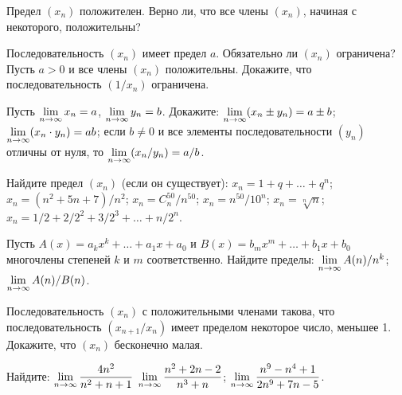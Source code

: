 \documentclass[a4paper,12pt]{article}
\begin{document}
Предел $(x_n)$ положителен. Верно ли, что все члены $(x_n)$, начиная с некоторого, положительны?

\begin{mdframed}[hidealllines=true, leftline=true, linecolor=gray!60,rightmargin=-10pt,outerlinewidth=4pt,innerbottommargin=.2\baselineskip,innertopmargin=.2\baselineskip,]
Последовательность $(x_n)$ имеет предел $a$.
Обязательно ли $(x_n)$ ограничена?\\
Пусть $a>0$ и все члены $(x_n)$ положительны. Докажите, что последовательность $(1/x_n)$ ограничена.
\end{mdframed}

\begin{mdframed}[hidealllines=true, leftline=true, linecolor=gray!60,rightmargin=-10pt,outerlinewidth=4pt]
Пусть
$\lim\limits_{n \rightarrow \infty} x_n = a$,
$\lim\limits_{n \rightarrow \infty} y_n = b$.
Докажите:
$\lim\limits_{n \rightarrow \infty} (x_n \pm y_n)= a \pm b$;
$\lim\limits_{n \rightarrow \infty} (x_n \cdot y_n) = ab$;
если $b\ne0$ и все элементы последовательности $(y_n)$ отличны от нуля, то $\lim\limits_{n \rightarrow \infty} (x_n/y_n) = a/b$.
\end{mdframed}

Найдите предел $(x_n)$ (если он существует):
%
{ $x_n=1+q+\ldots+q^{n}$;}%
{ $x_n=(n^2+5n+7)/n^2$;}%
{ $x_n=C^{50}_n/n^{50}$;}
\medskip
{}%
{ $x_n=n^{50}/10^n$;}%
{ $x_n=\sqrt[n]{n}$;}%
{ $x_n=1/2+2/2^2+3/2^3+\ldots+n/2^n$.}%


\newpage

\begin{mdframed}[hidealllines=true, leftline=true, linecolor=gray!60,rightmargin=-10pt,outerlinewidth=4pt]
Пусть $A(x)=a_k x^k+\ldots+a_1x+a_0$ и $B(x)=b_m x^m+\ldots+b_1x+b_0$\т многочлены степеней $k$ и $m$ соответственно. Найдите пределы:
$\lim\limits_{n \rightarrow \infty} A(n)/n^k$;
$\lim\limits_{n \rightarrow \infty} A(n)/B(n)$.
\end{mdframed}


Последовательность $(x_n)$ с положительными членами такова, что последовательность $(x_{n+1}/x_n)$ имеет пределом некоторое число, меньшее 1. Докажите, что $(x_n)$ бесконечно малая.

Найдите:
 $\lim\limits_{n \rightarrow \infty} \dfrac{4n^2}{n^2+n+1}$
 $\lim\limits_{n \rightarrow \infty} \dfrac{n^2+2n-2}{n^3+n}$;
 $\lim\limits_{n \rightarrow \infty} \dfrac{n^9-n^4+1}{2n^9+7n-5}$.
\end{document}
